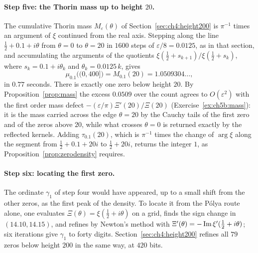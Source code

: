 \paragraph{Step five: the Thorin mass up to height $20$.} The cumulative Thorin mass $M_\varepsilon(\theta)$ of Section~\ref{sec:ch4:height200} is $\pi^{-1}$ times an argument of $\xi$ continued from the real axis. Stepping along the line $\frac12+0.1+i\theta$ from $\theta=0$ to $\theta=20$ in $1600$ steps of $\varepsilon/8=0.0125$, as in that section, and accumulating the arguments of the quotients $\xi(\frac12+s_{k+1})/\xi(\frac12+s_k)$, where $s_k=0.1+i\theta_k$ and $\theta_k=0.0125\,k$, gives
\[
\mu_{0.1}\big((0,400]\big)=M_{0.1}(20)=1.0509304\ldots,
\]
in $0.77$ seconds. There is exactly one zero below height $20$. By Proposition~\ref{prop:mass} the excess $0.0509$ over the count agrees to $O(\varepsilon^2)$ with the first order mass defect $-(\varepsilon/\pi)\Xi'(20)/\Xi(20)$ (Exercise~\ref{ex:ch5b:mass}): it is the mass carried across the edge $\theta=20$ by the Cauchy tails of the first zero and of the zeros above $20$, while what crosses $\theta=0$ is returned exactly by the reflected kernels. Adding $\tau_{0.1}(20)$, which is $\pi^{-1}$ times the change of $\arg\xi$ along the segment from $\frac12+0.1+20i$ to $\frac12+20i$, returns the integer $1$, as Proposition~\ref{prop:zerodensity} requires.

\paragraph{Step six: locating the first zero.} The ordinate $\gamma_1$ of step four would have appeared, up to a small shift from the other zeros, as the first peak of the density. To locate it from the P\'olya route alone, one evaluates $\Xi(\theta)=\xi(\frac12+i\theta)$ on a grid, finds the sign change in $(14.10,14.15)$, and refines by Newton's method with $\Xi'(\theta)=-\operatorname{Im}\xi'(\frac12+i\theta)$; six iterations give $\gamma_1$ to forty digits. Section~\ref{sec:ch4:height200} refines all $79$ zeros below height $200$ in the same way, at $420$ bits.

